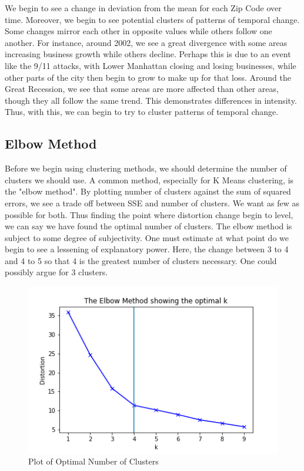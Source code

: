 \documentclass[letter, 11pt]{article} %
\begin{document}
		\noindent We begin to see a change in deviation from the mean for each Zip Code over time. Moreover, we begin to see potential clusters of patterns of temporal change. Some changes mirror each other in opposite values while others follow one another. For instance, around 2002, we see a great divergence with some areas increasing business growth while others decline. Perhaps this is due to an event like the 9/11 attacks, with Lower Manhattan closing and losing businesses, while other parts of the city then begin to grow to make up for that loss. Around the Great Recession, we see that some areas are more affected than other areas, though they all follow the same trend. This demonstrates differences in intensity. Thus, with this, we can begin to try to cluster patterns of temporal change.

		\pagebreak
	
	
	\subsection{Elbow Method}
	
		Before we begin using clustering methods, we should determine the number of clusters we should use. A common method, especially for K Means clustering, is the "elbow method". By plotting number of clusters against the sum of squared errors, we see a trade off between SSE and number of clusters. We want as few as possible for both. Thus finding the point where distortion change begin to level, we can say we have found the optimal number of clusters. The elbow method is subject to some degree of subjectivity. One must estimate at what point do we begin to see a lessening of explanatory power. Here, the change between 3 to 4 and 4 to 5 so that 4 is the greatest number of clusters necessary. One could possibly argue for 3 clusters. 
		
		\begin{figure}[H]
			\centering
			\caption{Plot of Optimal Number of Clusters}
			\includegraphics[width=\textwidth]{elbow.png}
		\end{figure}
		
\end{document}
